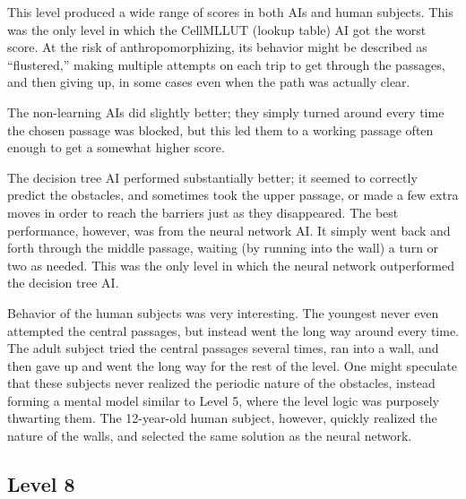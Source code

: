 \documentclass{article}
\begin{document}
This level produced a wide range of scores in both AIs and human subjects.  This was the only level in which the CellMLLUT (lookup table) AI got the worst score.  At the risk of anthropomorphizing, its behavior might be described as ``flustered,'' making multiple attempts on each trip to get through the passages, and then giving up, in some cases even when the path was actually clear.

The non-learning AIs did slightly better; they simply turned around every time the chosen passage was blocked, but this led them to a working passage often enough to get a somewhat higher score.

The decision tree AI performed substantially better; it seemed to correctly predict the obstacles, and sometimes took the upper passage, or made a few extra moves in order to reach the barriers just as they disappeared.  The best performance, however, was from the neural network AI.  It simply went back and forth through the middle passage, waiting (by running into the wall) a turn or two as needed.  This was the only level in which the neural network outperformed the decision tree AI.

Behavior of the human subjects was very interesting.  The youngest never even attempted the central passages, but instead went the long way around every time.  The adult subject tried the central passages several times, ran into a wall, and then gave up and went the long way for the rest of the level.  One might speculate that these subjects never realized the periodic nature of the obstacles, instead forming a mental model similar to Level 5, where the level logic was purposely thwarting them.  The 12-year-old human subject, however, quickly realized the nature of the walls, and selected the same solution as the neural network.

\subsection{Level 8}
\end{document}
